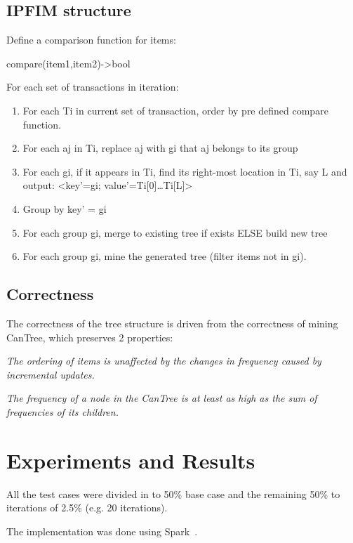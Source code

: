 \documentclass[sigconf, nonacm]{acmart}
\begin{document}
\subsection{IPFIM structure}
\begin{steps}
	\item Define a comparison function for items: 
	
	compare(item1,item2)->bool
	\item For each set of transactions in iteration:
		\begin{enumerate}
			\item For each Ti in current set of transaction, order by pre defined compare function.
			\item For each aj in Ti, replace aj with gi that aj belongs to its group
			\item For each gi, if it appears in Ti, find its right-most location in Ti, say L and output:
 <key'=gi; value'={Ti[0]…Ti[L]}>
 			\item Group by key' = gi
 			\item For each group gi, merge to existing tree if exists ELSE build new tree
 			\item For each group gi, mine the generated tree (filter items not in gi).
		\end{enumerate}
\end{steps}

\subsection{Correctness}
The correctness of the tree structure is driven from the correctness of mining CanTree, which preserves 2 properties:
\begin{properties}
\item \textit{The ordering of items is unaffected by the
changes in frequency caused by incremental updates.}
\item \textit{The frequency of a node in the CanTree is at
least as high as the sum of frequencies of its children.}
\end{properties}


\section{Experiments and Results}


All the test cases were divided in to 50\% base case and the remaining 50\% to iterations of 2.5\% (e.g. 20 iterations).

The implementation was done using Spark~\cite{spark}.
\end{document}
